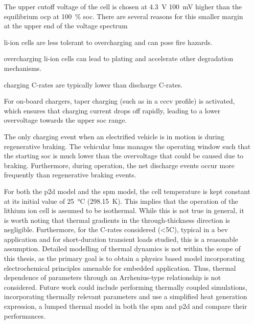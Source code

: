 The  upper  cutoff voltage  of  the  cell  is  chosen at  \SI{4.3}{\volt}  \ie{}
\approx\SI{100}{\milli\volt}   higher   than   the  equilibrium   \gls{ocp}   at
\SI{100}{\percent} \gls{soc}. There are several  reasons for this smaller margin
at the upper end of the voltage spectrum
\begin{description}[leftmargin=!,labelwidth=\widthof{\bfseries low
    probabilities},itemsep=1ex]

\item[safety] li-ion  cells are less  tolerant to overcharging and  can pose
    fire hazards.

\item[degradation]  overcharging  li-ion  cells  can  lead  to  plating  and
    accelerate other degradation mechanisms.

\item[low  C-rates]  charging C-rates  are  typically  lower than  discharge
    C-rates.

\item[CCCV charging]  For on-board  chargers, taper charging  (such as  in a
    \gls{cccv} profile) is activated, which  ensures that charging current drops
    off  rapidly, leading  to a  lower overvoltage  towards the  upper \gls{soc}
    range.

\item[low probabilities] The only charging event when an electrified vehicle
    is in motion is during regenerative braking. The vehicular \gls{bms} manages
    the operating window such that the starting \gls{soc} is much lower than the
    overvoltage  that  could  be  caused due  to  braking.  Furthermore,  during
    operation, the net discharge events  occur more frequently than regenerative
    braking events.

\end{description}

For  both the  \gls{p2d} model  and the  \gls{spm} model,  the cell  temperature
is   kept   constant   at   its   initial   value   of   \SI{25}{\degreeCelsius}
(\SI{298.15}{\kelvin}). This implies that the  operation of the lithium ion cell
is assumed  to be isothermal.  While this  is not true  in general, it  is worth
noting that thermal gradients in  the through-thickness direction is negligible.
 Furthermore, for  the C-rates considered (<5C), typical
in a \gls{bev} application and  for short-duration transient loads studied, this
is a reasonable assumption. Detailed modelling of thermal dynamics is not within
the scope of this thesis, as the primary goal is to obtain a physics based model
incorporating  electrochemical  principles  amenable for  embedded  application.
Thus, thermal dependence of parameters through an Arrhenius-type relationship is
not  considered.    Future   work  could   include  performing   thermally  coupled
simulations, incorporating  thermally relevant  parameters and use  a simplified
heat generation expression,  \eg{} a lumped thermal model in  both the \gls{spm}
and \gls{p2d} and compare their performances.

